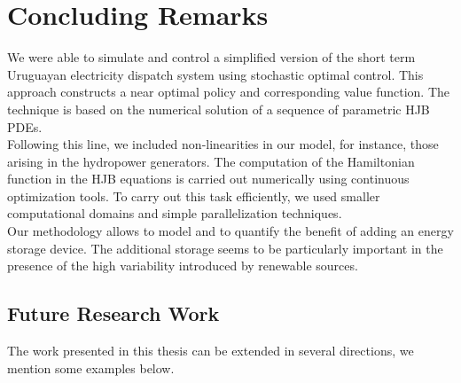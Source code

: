 
\chapter{Concluding Remarks}

We were able to simulate and control a simplified version of the short term Uruguayan electricity dispatch system using stochastic optimal control. This approach constructs a near optimal policy and corresponding value function.  The technique is based on the numerical solution of a sequence of parametric HJB PDEs. \\
Following this line, we included non-linearities in our model, for instance, those arising in the hydropower generators. The computation of the Hamiltonian function in the HJB equations is carried out numerically using continuous optimization tools. To carry out this task efficiently, we used smaller computational domains and simple parallelization techniques. \\
Our methodology allows to model and to quantify the benefit of adding an energy storage device. The additional storage seems to be particularly important in the presence of the high variability introduced by renewable sources.

\section{Future Research Work}

The work presented in this thesis can be extended in several directions, we mention some examples below.

